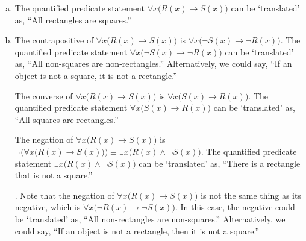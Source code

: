 \documentclass[11pt,letterpaper]{article}
\begin{document}
\sol 
\begin{enumerate}[(a)]
\item The quantified predicate statement $\forall x \big( R(x) \to S(x) \big)$ can be `translated' as, ``All rectangles are squares.'' \pspace

\item The contrapositive of $\forall x \big( R(x) \to S(x) \big)$ is $\forall x \big( \neg S(x) \to \neg R(x) \big)$. The quantified predicate statement $\forall x \big( \neg S(x) \to \neg R(x) \big)$ can be `translated' as, ``All non-squares are non-rectangles.'' Alternatively, we could say, ``If an object is not a square, it is not a rectangle.'' \pspace

The converse of $\forall x \big( R(x) \to S(x) \big)$ is $\forall x \big( S(x) \to R(x) \big)$. The quantified predicate statement $\forall x \big( S(x) \to R(x) \big)$ can be `translated' as, ``All squares are rectangles.'' \pspace

The negation of $\forall x \big( R(x) \to S(x) \big)$ is $\neg \bigg( \forall x \big( R(x) \to S(x) \big) \bigg) \equiv \exists x \big( R(x) \wedge \neg S(x) \big)$. The quantified predicate statement $\exists x \big( R(x) \wedge \neg S(x) \big)$ can be `translated' as, ``There is a rectangle that is not a square.'' \pspace

. Note that the negation of $\forall x \big( R(x) \to S(x) \big)$ is not the same thing as its negative, which is $\forall x \big( \neg R(x) \to \neg S(x) \big)$. In this case, the negative could be `translated' as, ``All non-rectangles are non-squares.'' Alternatively, we could say, ``If an object is not a rectangle, then it is not a square.''
\end{enumerate}
\end{document}
